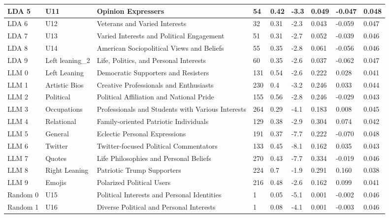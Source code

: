 \documentclass{article}
\begin{document}
\begin{table}[!ht]
\begin{tabular}{|p{2cm}|p{2cm}|p{6cm}|p{1.2cm}|p{1cm}|p{1cm}|p{1.1cm}|p{1.3cm}|p{1cm}|}
        LDA 5 & U11 & Opinion Expressers & 54 & 0.42 & -3.3 & 0.049 & -0.047 & 0.048 \\ \hline
        LDA 6 & U12 & Veterans and Varied Interests & 32 & 0.31 & -2.3 & 0.043 & -0.059 & 0.047 \\ \hline
        LDA 7 & U13 & Varied Interests and Political Engagement & 51 & 0.31 & -2.7 & 0.052 & -0.039 & 0.046 \\ \hline
        LDA 8 & U14 & American Sociopolitical Views and Beliefs & 55 & 0.35 & -2.8 & 0.061 & -0.056 & 0.046 \\ \hline
        LDA 9 & Left leaning\_2 & Life, Politics, and Personal Interests & 60 & 0.35 & -2.6 & 0.037 & -0.062 & 0.047 \\ \hline
        LLM 0 & Left Leaning & Democratic Supporters and Resisters & 131 & 0.54 & -2.6 & 0.222 & 0.028 & 0.041 \\ \hline
        LLM 1 & Artistic Bios & Creative Professionals and Enthusiasts & 230 & 0.4 & -3.2 & 0.246 & 0.033 & 0.044 \\ \hline
        LLM 2 & Political & Political Affiliation and National Pride & 155 & 0.56 & -2.8 & 0.246 & -0.029 & 0.043 \\ \hline
        LLM 3 & Occupations & Professionals and Students with Various Interests & 264 & 0.29 & -4.1 & 0.183 & 0.008 & 0.045 \\ \hline
        LLM 4 & Relational & Family-oriented Patriotic Individuals & 129 & 0.38 & -2.9 & 0.304 & 0.074 & 0.042 \\ \hline
        LLM 5 & General & Eclectic Personal Expressions & 191 & 0.37 & -7.7 & 0.222 & -0.070 & 0.048 \\ \hline
        LLM 6 & Twitter & Twitter-focused Political Commentators & 133 & 0.45 & -8.1 & 0.162 & 0.035 & 0.043 \\ \hline
        LLM 7 & Quotes & Life Philosophies and Personal Beliefs & 270 & 0.43 & -7.7 & 0.334 & -0.019 & 0.046 \\ \hline
        LLM 8 & Right Leaning & Patriotic Trump Supporters & 224 & 0.7 & -1.9 & 0.291 & 0.160 & 0.038 \\ \hline
        LLM 9 & Emojis & Polarized Political Users & 216 & 0.48 & -2.6 & 0.162 & 0.099 & 0.041 \\ \hline
        Random 0 & U15 & Political Interests and Personal Identities & 1 & 0.05 & -5.1 & 0.001 & -0.002 & 0.046 \\ \hline
        Random 1 & U16 & Diverse Political and Personal Interests & 1 & 0.08 & -4.1 & 0.001 & -0.003 & 0.046 \\ \hline

\end{tabular}
\end{table}
\end{document}
